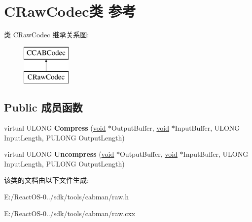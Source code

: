 \hypertarget{class_c_raw_codec}{}\section{C\+Raw\+Codec类 参考}
\label{class_c_raw_codec}
类 C\+Raw\+Codec 继承关系图\+:\begin{figure}[H]
\begin{center}
\leavevmode
\includegraphics[height=2.000000cm]{class_c_raw_codec}
\end{center}
\end{figure}
\subsection*{Public 成员函数}
\begin{DoxyCompactItemize}
\item 
\mbox{\label{class_c_raw_codec_a98701eecc94b07e503125ac496bae6bc}} 
virtual U\+L\+O\+NG {\bfseries Compress} (\hyperlink{interfacevoid}{void} $\ast$Output\+Buffer, \hyperlink{interfacevoid}{void} $\ast$Input\+Buffer, U\+L\+O\+NG Input\+Length, P\+U\+L\+O\+NG Output\+Length)
\item 
\mbox{\label{class_c_raw_codec_afb2fc5298b2caf2b2e8200cae1aedca3}} 
virtual U\+L\+O\+NG {\bfseries Uncompress} (\hyperlink{interfacevoid}{void} $\ast$Output\+Buffer, \hyperlink{interfacevoid}{void} $\ast$Input\+Buffer, U\+L\+O\+NG Input\+Length, P\+U\+L\+O\+NG Output\+Length)
\end{DoxyCompactItemize}


该类的文档由以下文件生成\+:\begin{DoxyCompactItemize}
\item 
E\+:/\+React\+O\+S-\/0../sdk/tools/cabman/raw.\+h\item 
E\+:/\+React\+O\+S-\/0../sdk/tools/cabman/raw.\+cxx\end{DoxyCompactItemize}
